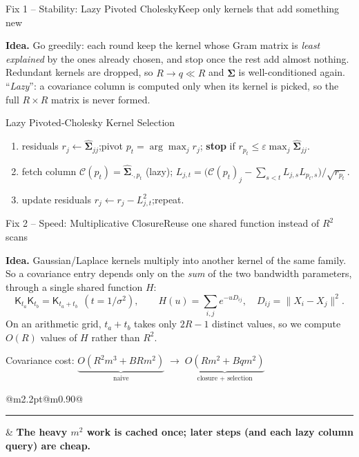 \documentclass[aspectratio=169,10pt]{beamer}
\makeatletter
\newcommand{\keyline}[1]{%
  \vspace{0.04cm}
  \noindent\begin{tabular}{@{}m{2.2pt}@{\hspace{0.55em}}m{0.90\linewidth}@{}}
    {\color{accentgreen}\rule{2.2pt}{1.35em}} & \textbf{#1}
  \end{tabular}
  \vspace{0.09cm}
}
\newcommand{\sfK}{\mathsf{K}}                      %
\newcommand{\Sig}{\hat{\boldsymbol{\Sigma}}}        %
\makeatother
\begin{document}
\begin{frame}{Fix 1 -- Stability: Lazy Pivoted Cholesky}{Keep only kernels that add something new}

\vspace{0.04cm}
\textbf{Idea.} Go greedily: each round keep the kernel whose Gram matrix is
\emph{least explained} by the ones already chosen, and stop once the rest add almost
nothing. Redundant kernels are dropped, so $R\to q\ll R$ and $\Sig$ is well-conditioned again.
``\emph{Lazy}'': a covariance column is computed only when its kernel is picked, so the full
$R\times R$ matrix is never formed.

\vspace{0.12cm}
\begin{block}{Lazy Pivoted-Cholesky Kernel Selection}
\small
\begin{enumerate}\setlength\itemsep{2.2pt}
  \item residuals $r_j \leftarrow \Sig_{jj}$;\quad pivot $p_t=\arg\max_j r_j$;\quad
        \textbf{stop} if $r_{p_t}\le \varepsilon\max_j \Sig_{jj}$.
  \item fetch column $\mathcal C(p_t)=\Sig_{\cdot,p_t}$ (lazy);\quad
        $L_{j,t}=\big(\mathcal C(p_t)_j-\textstyle\sum_{s<t}L_{j,s}L_{p_t,s}\big)/\sqrt{r_{p_t}}$.
  \item update residuals $r_j \leftarrow r_j-L_{j,t}^{2}$;\quad repeat.
\end{enumerate}
\end{block}

\end{frame}

\begin{frame}{Fix 2 -- Speed: Multiplicative Closure}{Reuse one shared function instead of $R^2$ scans}

\vspace{0.04cm}
\textbf{Idea.} Gaussian/Laplace kernels multiply into another kernel of the same
family. So a covariance entry depends only on the \emph{sum} of the two bandwidth parameters,
through a single shared function $H$:
\[
  \sfK_{t_a}\sfK_{t_b}=\sfK_{t_a+t_b}\ \ (t=1/\sigma^2),
  \qquad
  H(u)=\sum_{i,j} e^{-u D_{ij}},\quad D_{ij}=\|X_i-X_j\|^2 .
\]
On an arithmetic grid, $t_a+t_b$ takes only $2R-1$ distinct values, so we compute $O(R)$
values of $H$ rather than $R^2$.

\vspace{0.22cm}
\begin{center}
Covariance cost:\quad
$\underbrace{O(R^2 m^3 + B R m^2)}_{\text{naive}}
\;\longrightarrow\;
\underbrace{O(R m^2 + B q m^2)}_{\text{closure + selection}}$
\end{center}

\vspace{0.10cm}
\keyline{The heavy $m^2$ work is cached once; later steps (and each lazy column query) are cheap.}

\end{frame}
\end{document}
